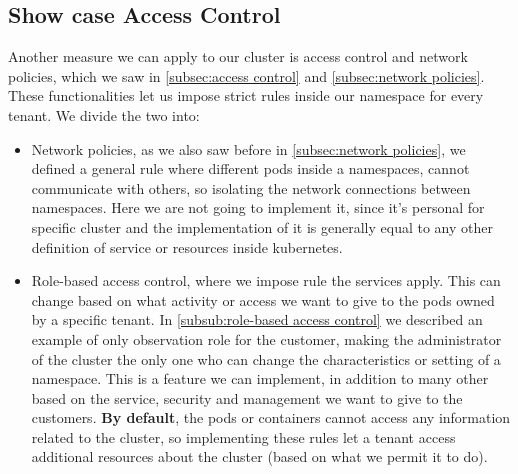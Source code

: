 \subsection{Show case Access Control}
Another measure we can apply to our cluster is access control and network policies, which we saw in \autoref{subsec:access control} and \autoref{subsec:network policies}. These functionalities let us impose strict rules inside our namespace for every tenant. We divide the two into:
\begin{itemize}
    \item Network policies, as we also saw before in \autoref{subsec:network policies}, we defined a general rule where different pods inside a namespaces, cannot communicate with others, so isolating the network connections between namespaces. Here we are not going to implement it, since it's personal for specific cluster and the implementation of it is generally equal to any other definition of service or resources inside kubernetes.
    \item Role-based access control, where we impose rule the services apply. This can change based on what activity or access we want to give to the pods owned by a specific tenant. In \autoref{subsub:role-based access control} we described an example of only observation role for the customer, making the administrator of the cluster the only one who can change the characteristics or setting of a namespace. This is a feature we can implement, in addition to many other based on the service, security and management we want to give to the customers. \textbf{By default}, the pods or containers cannot access any information related to the cluster, so implementing these rules let a tenant access additional resources about the cluster (based on what we permit it to do).
\end{itemize}

